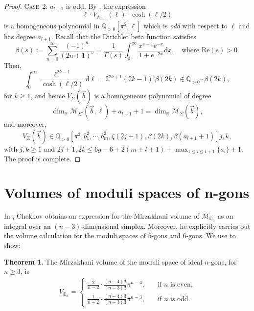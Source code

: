 \documentclass{amsart}
\newcommand{\DD}{\mathbb{D}}
\newcommand{\QQ}{\mathbb{Q}}
\theoremstyle{definition}
\newtheorem{theorem}[proposition]{Theorem}
\begin{document}
\begin{proof}
\noindent\textsc{Case~2:} $a_{l+1}$ is odd. By , the expression
\[
\ell \cdot V_{\mathbb{A}_{a_{l+1}}}(\ell) \cdot \cosh (\ell/2)
\]
is a homogeneous polynomial in $\QQ_{>0}[\pi^2,\ell]$ which is \textit{odd} with respect to $\ell$ and has degree $a_{l+1}$. Recall \cite{wikipedia:dirichlet_beta} that the Dirichlet beta function satisfies
\[
\beta(s) 
:= \sum_{n=0}^\infty \frac{(-1)^n}{(2n+1)^s} 
= \frac{1}{\Gamma(s)}  \int_0^\infty\frac{x^{s-1}e^{-x}}{1+e^{-2x}}\mathrm{d}x,
\quad\text{where }\mathrm{Re}(s)>0.
\]    
Then,
\begin{equation}
\label{eq:dirichlet-beta}
\int_0^\infty\frac{\ell^{2k-1}}{\cosh(\ell/2)}\mathrm{d}\ell 
= 2^{2k+1}(2k-1)!\beta(2k)
\in \QQ_{>0}\cdot\beta(2k),
\end{equation}
for $k\geqslant 1$, and hence $V_{\Sigma}(\vec{b})$ is a homogeneous polynomial of degree
\[
\dim_{\mathbb{R}}\mathcal{M}_{\Sigma'}(\vec{b},\ell) +a_{l+1}+1 = \dim_{\mathbb{R}}\mathcal{M}_{\Sigma}(\vec{b}),
\]
and moreover, 
\[
V_{\Sigma}(\vec{b}) \in \QQ_{>0}[\pi^2, b_1^2,\cdots,b_m^2, \zeta(2j+1),\beta(2k),\beta(a_{l+1}+1)]{j,k},
\] 
with $j,k\geqslant1$ and $2j+1,2k \leqslant  6g-6+2(m+l+1)+\max_{1\leqslant i\leqslant l+1}\{a_i\}+1$. The proof is complete.
\end{proof}











\section{Volumes of moduli spaces of n-gons}
\label{subsec: ideal polygons}
In \cite[Proposition~6.2]{chekhov2024}, Chekhov obtains an expression for the Mirzakhani volume of $\mathcal{M}_{\mathbb{D}_n}$ as an integral over an $(n-3)$-dimensional simplex. Moreover, he explicitly carries out the volume calculation for the moduli spaces of $5$-gons and $6$-gons. We use \cite{MO402985} to show:\medskip 

\begin{theorem}
\label{thm:ngonvol}
The Mirzakhani volume of the moduli space of ideal $n$-gons, for $n\geqslant 3$, is
\begin{align*}
V_{\DD_n} = \left\{
\begin{array}{rl}
\frac{2}{n-2}\cdot\frac{(n-4)!!}{(n-3)!!}\pi^{n-4},
&\quad\text{if }n\text{ is even,}
\\[0.25em]
  \frac{1}{n-2}\cdot\frac{(n-4)!!}{(n-3)!!}\pi^{n-3},
&\quad\text{if }n\text{ is odd.}
\end{array}
\right.    
\end{align*}  
\end{theorem}
\end{document}
